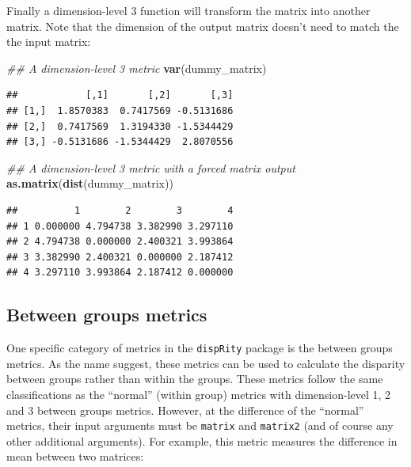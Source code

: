\documentclass[]{book}
\newenvironment{Shaded}{\begin{snugshade}}{\end{snugshade}}
\newcommand{\CommentTok}[1]{\textcolor[rgb]{0.56,0.35,0.01}{\textit{#1}}}
\newcommand{\KeywordTok}[1]{\textcolor[rgb]{0.13,0.29,0.53}{\textbf{#1}}}
\newcommand{\NormalTok}[1]{#1}
\begin{document}
Finally a dimension-level 3 function will transform the matrix into another matrix.
Note that the dimension of the output matrix doesn't need to match the the input matrix:

\begin{Shaded}
\begin{Highlighting}[]
\CommentTok{## A dimension-level 3 metric}
\KeywordTok{var}\NormalTok{(dummy_matrix)}
\end{Highlighting}
\end{Shaded}

\begin{verbatim}
##            [,1]       [,2]       [,3]
## [1,]  1.8570383  0.7417569 -0.5131686
## [2,]  0.7417569  1.3194330 -1.5344429
## [3,] -0.5131686 -1.5344429  2.8070556
\end{verbatim}

\begin{Shaded}
\begin{Highlighting}[]
\CommentTok{## A dimension-level 3 metric with a forced matrix output}
\KeywordTok{as.matrix}\NormalTok{(}\KeywordTok{dist}\NormalTok{(dummy_matrix))}
\end{Highlighting}
\end{Shaded}

\begin{verbatim}
##          1        2        3        4
## 1 0.000000 4.794738 3.382990 3.297110
## 2 4.794738 0.000000 2.400321 3.993864
## 3 3.382990 2.400321 0.000000 2.187412
## 4 3.297110 3.993864 2.187412 0.000000
\end{verbatim}

\hypertarget{betweengroupmetricsexplain}{%
\subsection{Between groups metrics}\label{betweengroupmetricsexplain}}

One specific category of metrics in the \texttt{dispRity} package is the between groups metrics.
As the name suggest, these metrics can be used to calculate the disparity between groups rather than within the groups.
These metrics follow the same classifications as the ``normal'' (within group) metrics with dimension-level 1, 2 and 3 between groups metrics.
However, at the difference of the ``normal'' metrics, their input arguments must be \texttt{matrix} and \texttt{matrix2} (and of course any other additional arguments).
For example, this metric measures the difference in mean between two matrices:
\end{document}
